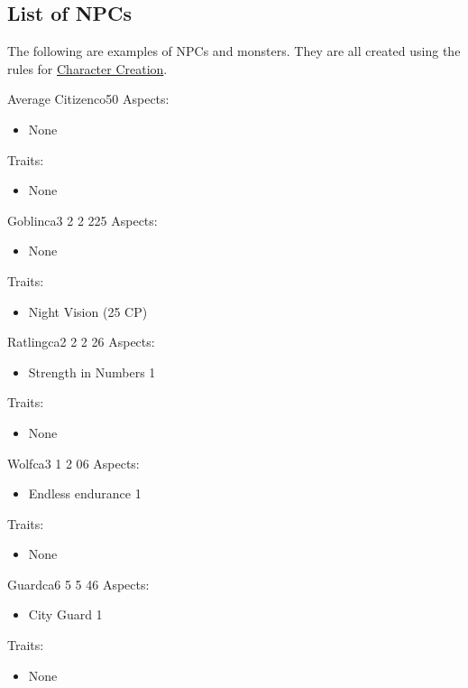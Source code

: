 \documentclass[11pt]{article}
\begin{document}
{\subsection{List of NPCs}
\label{sec:org5bd0ba3}
The following are examples of NPCs and monsters. They are all created using the rules for \hyperref[sec:orgd810251]{Character Creation}. 

\begin{npc}{Average Citizen}{co}{5}{0}
Aspects:
\begin{itemize}
\item None
\end{itemize}
Traits:
\begin{itemize}
\item None
\end{itemize}
\end{npc}

\begin{npc}{Goblin}{ca}{3 2 2 2}{25}
Aspects:
\begin{itemize}
\item None
\end{itemize}
Traits:
\begin{itemize}
\item Night Vision (25 CP)
\end{itemize}
\end{npc}

\begin{npc}{Ratling}{ca}{2 2 2 2}{6}
Aspects:
\begin{itemize}
\item Strength in Numbers 1
\end{itemize}
Traits:
\begin{itemize}
\item None
\end{itemize}
\end{npc}

\begin{npc}{Wolf}{ca}{3 1 2 0}{6}
Aspects:
\begin{itemize}
\item Endless endurance 1
\end{itemize}
Traits:
\begin{itemize}
\item None
\end{itemize}
\end{npc}

\begin{npc}{Guard}{ca}{6 5 5 4}{6}
Aspects:
\begin{itemize}
\item City Guard 1
\end{itemize}
Traits:
\begin{itemize}
\item None
\end{itemize}
\end{npc}

}
\end{document}
